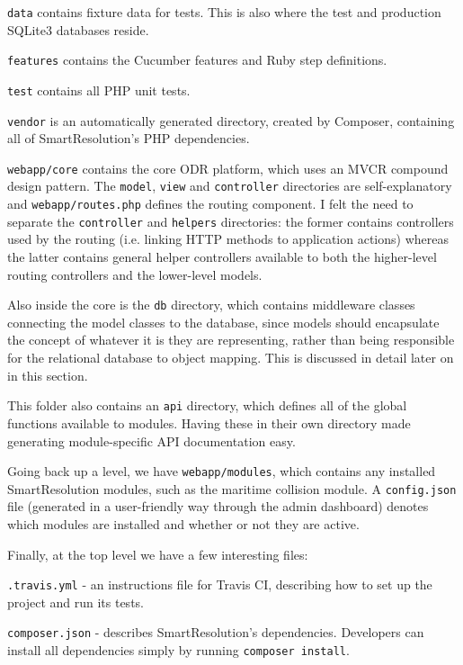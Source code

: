 \lstinline{data} contains fixture data for tests. This is also where the test and production SQLite3 databases reside.

\lstinline{features} contains the Cucumber features and Ruby step definitions.

\lstinline{test} contains all PHP unit tests.

\lstinline{vendor} is an automatically generated directory, created by Composer, containing all of SmartResolution's PHP dependencies.

\lstinline{webapp/core} contains the core ODR platform, which uses an MVCR compound design pattern. The \lstinline{model}, \lstinline{view} and \lstinline{controller} directories are self-explanatory and \lstinline{webapp/routes.php} defines the routing component. I felt the need to separate the \lstinline{controller} and \lstinline{helpers} directories: the former contains controllers used by the routing (i.e. linking HTTP methods to application actions) whereas the latter contains general helper controllers available to both the higher-level routing controllers and the lower-level models.

Also inside the core is the \lstinline{db} directory, which contains middleware classes connecting the model classes to the database, since models should encapsulate the concept of whatever it is they are representing, rather than being responsible for the relational database to object mapping. This is discussed in detail later on in this section.

This folder also contains an \lstinline{api} directory, which defines all of the global functions available to modules. Having these in their own directory made generating module-specific API documentation easy.

Going back up a level, we have \lstinline{webapp/modules}, which contains any installed SmartResolution modules, such as the maritime collision module. A \lstinline{config.json} file (generated in a user-friendly way through the admin dashboard) denotes which modules are installed and whether or not they are active.

Finally, at the top level we have a few interesting files:

\lstinline{.travis.yml} - an instructions file for Travis CI, describing how to set up the project and run its tests.

\lstinline{composer.json} - describes SmartResolution's dependencies. Developers can install all dependencies simply by running \lstinline{composer install}.

